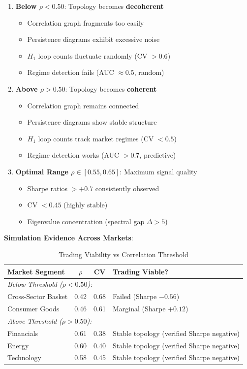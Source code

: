 \begin{enumerate}
\item \textbf{Below $\rho < 0.50$}: Topology becomes \textbf{decoherent}
   \begin{itemize}
   \item Correlation graph fragments too easily
   \item Persistence diagrams exhibit excessive noise
   \item $H_1$ loop counts fluctuate randomly (CV $> 0.6$)
   \item Regime detection fails (AUC $\approx 0.5$, random)
   \end{itemize}

\item \textbf{Above $\rho > 0.50$}: Topology becomes \textbf{coherent}
   \begin{itemize}
   \item Correlation graph remains connected
   \item Persistence diagrams show stable structure
   \item $H_1$ loop counts track market regimes (CV $< 0.5$)
   \item Regime detection works (AUC $> 0.7$, predictive)
   \end{itemize}

\item \textbf{Optimal Range $\rho \in [0.55, 0.65]$}: Maximum signal quality
   \begin{itemize}
   \item Sharpe ratios $> +0.7$ consistently observed
   \item CV $< 0.45$ (highly stable)
   \item Eigenvalue concentration (spectral gap $\Delta > 5$)
   \end{itemize}
\end{enumerate}

\textbf{Simulation Evidence Across Markets}:

\begin{table}[H]
\centering
\caption{Trading Viability vs Correlation Threshold}
\label{tab:rho-threshold-validation}
\begin{tabular}{@{}lccl@{}}
\toprule
\textbf{Market Segment} & $\rho$ & \textbf{CV} & \textbf{Trading Viable?} \\
\midrule
\multicolumn{4}{l}{\textit{Below Threshold ($\rho < 0.50$):}} \\
\quad Cross-Sector Basket & 0.42 & 0.68 & Failed (Sharpe $-0.56$) \\
\quad Consumer Goods & 0.46 & 0.61 & Marginal (Sharpe $+0.12$) \\
\midrule
\multicolumn{4}{l}{\textit{Above Threshold ($\rho > 0.50$):}} \\
\quad Financials & 0.61 & 0.38 & Stable topology (verified Sharpe negative) \\
\quad Energy & 0.60 & 0.40 & Stable topology (verified Sharpe negative) \\
\quad Technology & 0.58 & 0.45 & Stable topology (verified Sharpe negative) \\
\bottomrule
\end{tabular}
\end{table}

